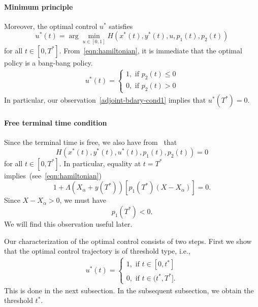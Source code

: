\documentclass[10pt,journal,letterpaper]{IEEEtran}
\begin{document}
\begin{IEEEproof}
\paragraph{Minimum principle} Moreover, the optimal control $u^{\ast}$ satisfies
\begin{equation*}
u^{\ast}(t) = \arg \min_{u \in [0,1]} H(x^{\ast}(t),y^{\ast}(t),u,p_1(t),p_2(t)) 
 \end{equation*}
for all $t \in [0,T^{\ast}]$. From~\eqref{eqn:hamiltonian}, it is
immediate that the optimal policy is a bang-bang policy.
\begin{align}
u^{\ast}(t) = \left\{ \begin{array}{ll}
                 1, \mbox{ if } p_2(t) \leq 0 \\
                 0, \mbox{ if } p_2(t) > 0\end{array} \right. \label{hamiltonian-min}
\end{align}
In particular, our observation~\eqref{adjoint-bdary-cond1} implies that
$u^{\ast}(T^{\ast}) = 0$. 
\paragraph{Free terminal time condition}
Since the terminal time is free, we also
have from~\cite[Section~3.4.3]{stochctrl.bertsekas05dpoc-vol1} that
\[
H(x^{\ast}(t),y^{\ast}(t),u^{\ast}(t),p_1(t),p_2(t)) = 0
\]
for all $t \in [0, T^{\ast}]$. In particular, equality at $t =
T^{\ast}$ implies~(see~\eqref{eqn:hamiltonian})
\[
1 + \Lambda(X_{\alpha} + y(T^{\ast}))[p_1(T^{\ast})(X - X_{\alpha})]
= 0.
\]
Since $X - X_{\alpha} > 0$, we must have
\begin{equation}
p_1(T^{\ast}) < 0. \label{adjoint-bdary-cond2}
\end{equation}
 We will find this observation useful later.

Our characterization of the optimal control consists of two steps.
First we show that the optimal control trajectory is of threshold
type, i.e.,
\begin{align}
u^{\ast}(t) = \left\{ \begin{array}{ll}
                 1, \mbox{ if } t \in [0, t^{\ast}]\\
                 0, \mbox{ if } t \in (t^{\ast},T^{\ast}].\end{array}
                 \right. \label{threshold-policy}
\end{align}
This is done in the next subsection. In the subsequent subsection,
we obtain the threshold $t^{\ast}$.


\end{IEEEproof}
\end{document}
